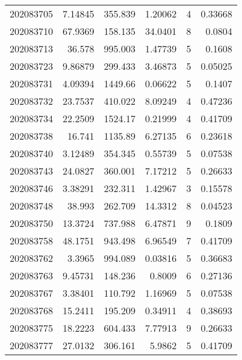 \begin{tabular}{rrrrrr}
 202083705 &          7.14845 &      355.839  &            1.20062 &           4 & 0.33668 \\
 202083710 &         67.9369  &      158.135  &           34.0401  &           8 & 0.0804  \\
 202083713 &         36.578   &      995.003  &            1.47739 &           5 & 0.1608  \\
 202083723 &          9.86879 &      299.433  &            3.46873 &           5 & 0.05025 \\
 202083731 &          4.09394 &     1449.66   &            0.06622 &           5 & 0.1407  \\
 202083732 &         23.7537  &      410.022  &            8.09249 &           4 & 0.47236 \\
 202083734 &         22.2509  &     1524.17   &            0.21999 &           4 & 0.41709 \\
 202083738 &         16.741   &     1135.89   &            6.27135 &           6 & 0.23618 \\
 202083740 &          3.12489 &      354.345  &            0.55739 &           5 & 0.07538 \\
 202083743 &         24.0827  &      360.001  &            7.17212 &           5 & 0.26633 \\
 202083746 &          3.38291 &      232.311  &            1.42967 &           3 & 0.15578 \\
 202083748 &         38.993   &      262.709  &           14.3312  &           8 & 0.04523 \\
 202083750 &         13.3724  &      737.988  &            6.47871 &           9 & 0.1809  \\
 202083758 &         48.1751  &      943.498  &            6.96549 &           7 & 0.41709 \\
 202083762 &          3.3965  &      994.089  &            0.03816 &           5 & 0.36683 \\
 202083763 &          9.45731 &      148.236  &            0.8009  &           6 & 0.27136 \\
 202083767 &          3.38401 &      110.792  &            1.16969 &           5 & 0.07538 \\
 202083768 &         15.2411  &      195.209  &            0.34911 &           4 & 0.38693 \\
 202083775 &         18.2223  &      604.433  &            7.77913 &           9 & 0.26633 \\
 202083777 &         27.0132  &      306.161  &            5.9862  &           5 & 0.41709 \\

\end{tabular}
